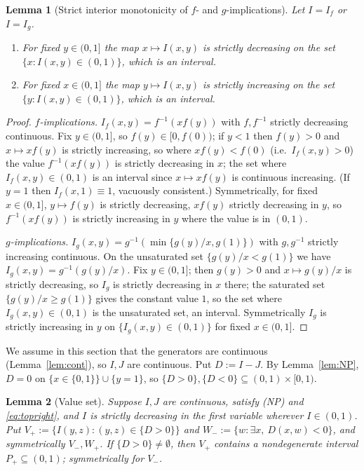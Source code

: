 \documentclass{amsart}
\theoremstyle{plain}
\newtheorem{lemma}{Lemma}
\theoremstyle{definition}
\begin{document}
\begin{lemma}[Strict interior monotonicity of $f$- and $g$-implications]\label{lem:strict}
Let $I=I_f$ or $I=I_g$.
\begin{enumerate}
\item For fixed $y\in(0,1]$ the map $x\mapsto I(x,y)$ is strictly decreasing on the set
$\{x:I(x,y)\in(0,1)\}$, which is an interval.
\item For fixed $x\in(0,1]$ the map $y\mapsto I(x,y)$ is strictly increasing on the set
$\{y:I(x,y)\in(0,1)\}$, which is an interval.
\end{enumerate}
\end{lemma}

\begin{proof}
\emph{$f$-implications.} $I_f(x,y)=f^{-1}(x f(y))$ with $f,f^{-1}$ strictly decreasing
continuous. Fix $y\in(0,1]$, so $f(y)\in[0,f(0))$; if $y<1$ then $f(y)>0$ and
$x\mapsto x f(y)$ is strictly increasing, so where $x f(y)<f(0)$ (i.e.\ $I_f(x,y)>0$) the
value $f^{-1}(xf(y))$ is strictly decreasing in $x$; the set where $I_f(x,y)\in(0,1)$ is
an interval since $x\mapsto xf(y)$ is continuous increasing.  (If $y=1$ then
$I_f(x,1)\equiv 1$, vacuously consistent.)  Symmetrically, for fixed $x\in(0,1]$,
$y\mapsto f(y)$ is strictly decreasing, $x f(y)$ strictly decreasing in $y$, so
$f^{-1}(xf(y))$ is strictly increasing in $y$ where the value is in $(0,1)$.

\emph{$g$-implications.} $I_g(x,y)=g^{-1}(\min\{g(y)/x,g(1)\})$ with $g,g^{-1}$ strictly
increasing continuous. On the unsaturated set $\{g(y)/x<g(1)\}$ we have
$I_g(x,y)=g^{-1}(g(y)/x)$.  Fix $y\in(0,1]$; then $g(y)>0$ and $x\mapsto g(y)/x$ is
strictly decreasing, so $I_g$ is strictly decreasing in $x$ there; the saturated set
$\{g(y)/x\ge g(1)\}$ gives the constant value $1$, so the set where $I_g(x,y)\in(0,1)$ is
the unsaturated set, an interval. Symmetrically $I_g$ is strictly increasing in $y$ on
$\{I_g(x,y)\in(0,1)\}$ for fixed $x\in(0,1]$.
\end{proof}

We assume in this section that the generators are continuous (Lemma~\ref{lem:cont}), so
$I,J$ are continuous.  Put $D:=I-J$.  By Lemma~\ref{lem:NP}, $D=0$ on
$\{x\in\{0,1\}\}\cup\{y=1\}$, so $\{D>0\},\{D<0\}\subseteq(0,1)\times[0,1)$.

\begin{lemma}[Value set]\label{lem:value}
Suppose $I,J$ are continuous, satisfy \textup{(NP)} and \eqref{eq:topright}, and $I$ is
strictly decreasing in the first variable wherever $I\in(0,1)$.  Put
$V_+:=\{I(y,z):(y,z)\in\{D>0\}\}$ and $W_-:=\{w:\exists x,\ D(x,w)<0\}$, and symmetrically
$V_-,W_+$.  If $\{D>0\}\ne\emptyset$, then $V_+$ contains a nondegenerate interval
$P_+\subseteq(0,1)$; symmetrically for $V_-$.
\end{lemma}
\end{document}
